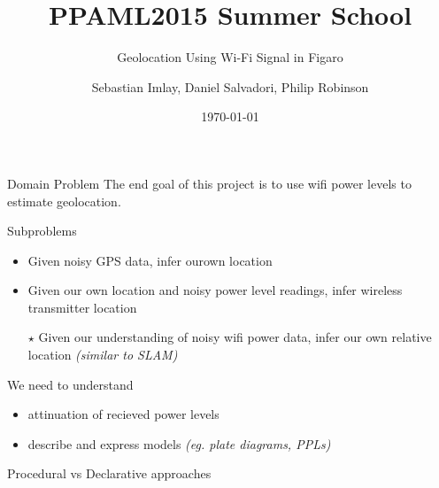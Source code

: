 \documentclass[11pt]{beamer}
\begin{document}
\title{PPAML2015 Summer School}

\subtitle{Geolocation Using Wi-Fi Signal in Figaro}

\author{Sebastian Imlay, Daniel Salvadori, Philip Robinson}


\date{\today}

\begin{frame}
  \titlepage
\end{frame}


\begin{frame}{Domain Problem}
The end goal of this project is to use wifi power levels to estimate geolocation.

Subproblems
\begin{itemize}
\item Given noisy GPS data, infer ourown location
\item Given our own location and noisy power level readings, infer wireless transmitter location
\item[$\star$] Given our understanding of noisy wifi power data, infer our own relative location {\em (similar to SLAM)}
\end{itemize}
We need to understand
\begin{itemize}
\item attinuation of recieved power levels
\item describe and express models {\em (eg. plate diagrams, PPLs)}
\end{itemize}
\end{frame}

\begin{frame}{Procedural vs Declarative approaches}
\end{frame}
\end{document}
